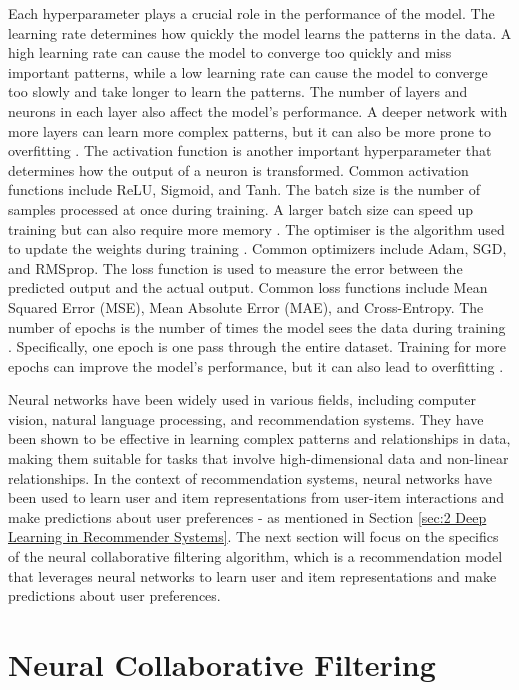 Each hyperparameter plays a crucial role in the performance of the model. The learning rate determines how quickly the model learns the patterns in the data. A high learning rate can cause the model to converge too quickly and miss important patterns, while a low learning rate can cause the model to converge too slowly and take longer to learn the patterns. The number of layers and neurons in each layer also affect the model's performance. A deeper network with more layers can learn more complex patterns, but it can also be more prone to overfitting \cite{zhang2018improved}. The activation function is another important hyperparameter that determines how the output of a neuron is transformed. Common activation functions include ReLU, Sigmoid, and Tanh. The batch size is the number of samples processed at once during training. A larger batch size can speed up training but can also require more memory \cite{diaz2017effective}. The optimiser is the algorithm used to update the weights during training \cite{zhang2018improved}. Common optimizers include Adam, SGD, and RMSprop. The loss function is used to measure the error between the predicted output and the actual output. Common loss functions include Mean Squared Error (MSE), Mean Absolute Error (MAE), and Cross-Entropy. The number of epochs is the number of times the model sees the data during training \cite{diaz2017effective}. Specifically, one epoch is one pass through the entire dataset. Training for more epochs can improve the model's performance, but it can also lead to overfitting \cite{gurney2018introduction}. 

Neural networks have been widely used in various fields, including computer vision, natural language processing, and recommendation systems. They have been shown to be effective in learning complex patterns and relationships in data, making them suitable for tasks that involve high-dimensional data and non-linear relationships. In the context of recommendation systems, neural networks have been used to learn user and item representations from user-item interactions and make predictions about user preferences - as mentioned in Section \ref{sec:2 Deep Learning in Recommender Systems}. The next section will focus on the specifics of the neural collaborative filtering algorithm, which is a recommendation model that leverages neural networks to learn user and item representations and make predictions about user preferences.


\section{Neural Collaborative Filtering}
\label{sec:4 Neural Collaborative Filtering}

